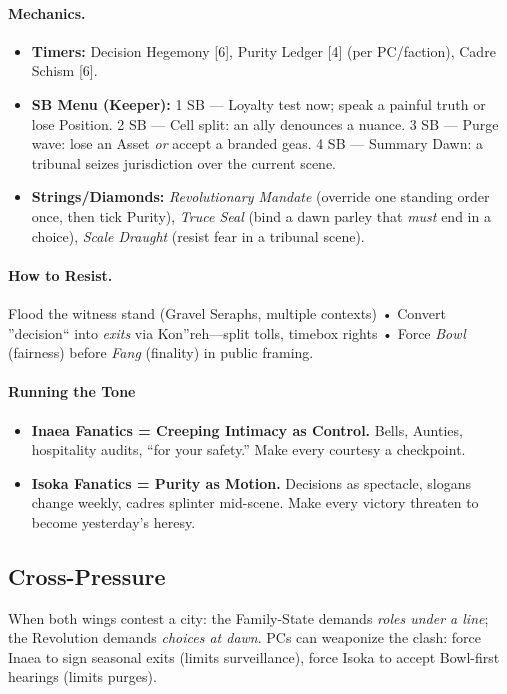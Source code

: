 \documentclass[11pt]{article}
\begin{document}
\paragraph{Mechanics.}
\begin{itemize}
  \item \textbf{Timers:} Decision Hegemony [6], Purity Ledger [4] (per PC/faction), Cadre Schism [6].
  \item \textbf{SB Menu (Keeper):} 
    1 SB --- Loyalty test now; speak a painful truth or lose Position. 
    2 SB --- Cell split: an ally denounces a nuance. 
    3 SB --- Purge wave: lose an Asset \emph{or} accept a branded geas. 
    4 SB --- Summary Dawn: a tribunal seizes jurisdiction over the current scene.
  \item \textbf{Strings/Diamonds:} 
    \emph{Revolutionary Mandate} (override one standing order once, then tick Purity), 
    \emph{Truce Seal} (bind a dawn parley that \emph{must} end in a choice), 
    \emph{Scale Draught} (resist fear in a tribunal scene).
\end{itemize}

\paragraph{How to Resist.}
Flood the witness stand (Gravel Seraphs, multiple contexts) • Convert ''decision`` into \emph{exits} via Kon''reh---split tolls, timebox rights • Force \emph{Bowl} (fairness) before \emph{Fang} (finality) in public framing.

\paragraph{Running the Tone}
\begin{itemize}
  \item \textbf{Inaea Fanatics = Creeping Intimacy as Control.} Bells, Aunties, hospitality audits, ``for your safety.'' Make every courtesy a checkpoint.
  \item \textbf{Isoka Fanatics = Purity as Motion.} Decisions as spectacle, slogans change weekly, cadres splinter mid-scene. Make every victory threaten to become yesterday's heresy.
\end{itemize}

\subsection*{Cross-Pressure}
When both wings contest a city: the Family-State demands \emph{roles under a line}; the Revolution demands \emph{choices at dawn}. PCs can weaponize the clash: force Inaea to sign seasonal exits (limits surveillance), force Isoka to accept Bowl-first hearings (limits purges).
\end{document}
